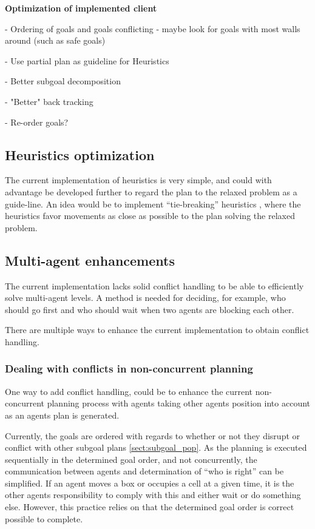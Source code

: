 \documentclass[Main]{subfiles}
\begin{document}
\textbf{Optimization of implemented client}


- Ordering of goals and goals conflicting - maybe look for goals with most walls around (such as safe goals)

- Use partial plan as guideline for Heuristics

- Better subgoal decomposition

- "Better" back tracking

- Re-order goals?

\subsection{Heuristics optimization}
The current implementation of heuristics is very simple, and could with advantage be developed further to regard the plan to the relaxed problem as a guide-line. An idea would be to implement ``tie-breaking'' heuristics \citep{stanford2015}, where the heuristics favor movements as close as possible to the plan solving the relaxed problem. 


\subsection{Multi-agent enhancements}

The current implementation lacks solid conflict handling to be able to efficiently solve multi-agent levels.
A method is needed for deciding, for example, who should go first and who should wait when two agents are blocking each other.

There are multiple ways to enhance the current implementation to obtain conflict handling.


\subsubsection{Dealing with conflicts in non-concurrent planning}

One way to add conflict handling, could be to enhance the current non-concurrent planning process with agents taking other agents position into account as an agents plan is generated.

Currently, the goals are ordered with regards to whether or not they disrupt or conflict with other subgoal plans \autoref{sect:subgoal_pop}.
As the planning is executed sequentially in the determined goal order, and not concurrently, the communication between agents and determination of ``who is right'' can be simplified.
If an agent moves a box or occupies a cell at a given time, it is the other agents responsibility to comply with this and either wait or do something else.
However, this practice relies on that the determined goal order is correct possible to complete.
\end{document}
